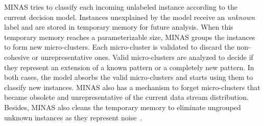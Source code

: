 MINAS tries to classify each incoming unlabeled instance according to the
current decision model. Instances unexplained by the model
receive an \textit{unknown} label and are stored in temporary memory for future
analysis.
When this temporary memory reaches a parameterizable size, MINAS groups the
instances to form new micro-clusters.
Each micro-cluster is validated to discard the non-cohesive or unrepresentative
ones.
Valid micro-clusters are analyzed to decide if they represent an extension of a
known pattern or a completely new pattern. In both cases, the model absorbs the
valid micro-clusters and starts using them to classify new instances.
MINAS also has a mechanism to forget micro-clusters that became obsolete and
unrepresentative of the current data stream distribution.
Besides, MINAS also cleans the temporary memory to eliminate ungrouped unknown
instances as they represent noise~\cite{Faria2016minas}.



